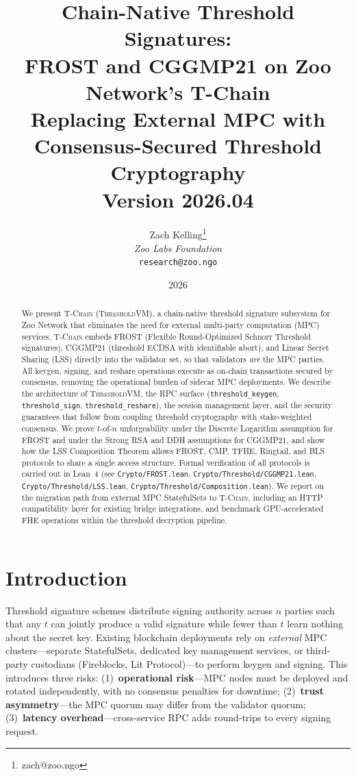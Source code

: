 \documentclass[11pt,letterpaper]{article}
\title{\textbf{Chain-Native Threshold Signatures:\\FROST and CGGMP21 on Zoo Network's T-Chain}\\
\large Replacing External MPC with Consensus-Secured Threshold Cryptography\\
\vspace{5pt}
\normalsize Version 2026.04}
\author{
Zach Kelling\thanks{zach@zoo.ngo}\\
\textit{Zoo Labs Foundation}\\
\texttt{research@zoo.ngo}
}
\date{2026}
\theoremstyle{definition}
\theoremstyle{remark}
\newcommand{\TChain}{\textsc{T-Chain}}
\newcommand{\ThresholdVM}{\textsc{ThresholdVM}}
\newcommand{\FROST}{\textsc{FROST}}
\newcommand{\CGGMP}{\textsc{CGGMP21}}
\newcommand{\LSS}{\textsc{LSS}}
\begin{document}
\zoocoverpage

\begin{abstract}
We present \TChain{} (\ThresholdVM{}), a chain-native threshold signature subsystem for Zoo Network that eliminates the need for external multi-party computation (MPC) services. \TChain{} embeds \FROST{} (Flexible Round-Optimized Schnorr Threshold signatures), \CGGMP{} (threshold ECDSA with identifiable abort), and Linear Secret Sharing (\LSS{}) directly into the validator set, so that validators \emph{are} the MPC parties. All keygen, signing, and reshare operations execute as on-chain transactions secured by consensus, removing the operational burden of sidecar MPC deployments. We describe the architecture of \ThresholdVM{}, the RPC surface (\texttt{threshold\_keygen}, \texttt{threshold\_sign}, \texttt{threshold\_reshare}), the session management layer, and the security guarantees that follow from coupling threshold cryptography with stake-weighted consensus. We prove $t$-of-$n$ unforgeability under the Discrete Logarithm assumption for \FROST{} and under the Strong RSA and DDH assumptions for \CGGMP{}, and show how the \LSS{} Composition Theorem allows \FROST{}, CMP, TFHE, Ringtail, and BLS protocols to share a single access structure. Formal verification of all protocols is carried out in Lean~4 (see \texttt{Crypto/FROST.lean}, \texttt{Crypto/Threshold/CGGMP21.lean}, \texttt{Crypto/Threshold/LSS.lean}, \texttt{Crypto/Threshold/Composition.lean}). We report on the migration path from external MPC StatefulSets to \TChain{}, including an HTTP compatibility layer for existing bridge integrations, and benchmark GPU-accelerated FHE operations within the threshold decryption pipeline.
\end{abstract}

\tableofcontents
\newpage

\section{Introduction}
\label{sec:introduction}

Threshold signature schemes distribute signing authority across $n$ parties such that any $t$ can jointly produce a valid signature while fewer than $t$ learn nothing about the secret key. Existing blockchain deployments rely on \emph{external} MPC clusters---separate StatefulSets, dedicated key management services, or third-party custodians (Fireblocks, Lit Protocol)---to perform keygen and signing. This introduces three risks: (1)~\textbf{operational risk}---MPC nodes must be deployed and rotated independently, with no consensus penalties for downtime; (2)~\textbf{trust asymmetry}---the MPC quorum may differ from the validator quorum; (3)~\textbf{latency overhead}---cross-service RPC adds round-trips to every signing request.
\end{document}
